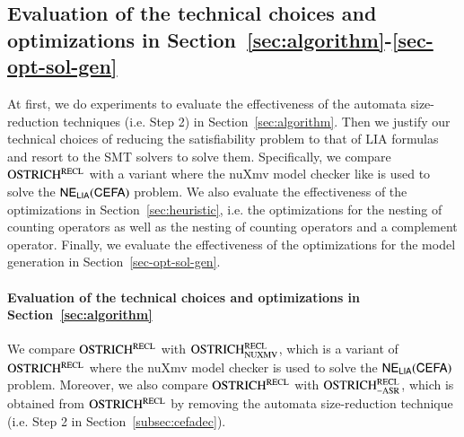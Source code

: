 
\subsection{Evaluation of the technical choices and optimizations in Section~\ref{sec:algorithm}-\ref{sec-opt-sol-gen}}\label{subsec:size_reduction_eval}

At first, we do experiments to evaluate the effectiveness of the automata size-reduction techniques (i.e. Step 2) in Section~\ref{sec:algorithm}. Then we justify our technical choices of reducing the satisfiability problem to that of LIA formulas and resort to the SMT solvers to solve them. Specifically, we compare $\rm OSTRICH^{RECL}$ with a variant where the nuXmv model checker like \cite{atva2020} is used to solve the ${\sf NE_{LIA}(CEFA)}$ problem. 
%
We also evaluate the effectiveness of the optimizations in Section~\ref{sec:heuristic}, i.e. the optimizations for the nesting of counting operators as well as the nesting of counting operators and a complement operator. Finally, we evaluate the effectiveness of the optimizations for the model generation in Section~\ref{sec-opt-sol-gen}. 


\paragraph*{Evaluation of the technical choices and optimizations in Section~\ref{sec:algorithm}}
%
We compare $\rm OSTRICH^{RECL}$ with $\rm OSTRICH^{RECL}_{\rm NUXMV}$, which is a variant of $\rm OSTRICH^{RECL}$ where the nuXmv model checker is used to solve the ${\sf NE_{LIA}(CEFA)}$ problem. Moreover, we also compare $\rm OSTRICH^{RECL}$ with $\rm OSTRICH^{RECL}_{\rm -ASR}$, which is obtained from $\rm OSTRICH^{RECL}$ by removing the automata size-reduction technique (i.e. Step 2 in Section~\ref{subsec:cefadec}). 

